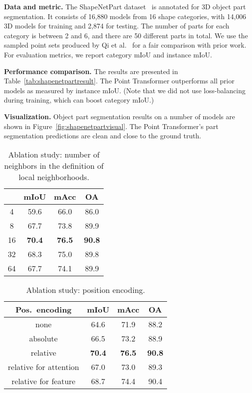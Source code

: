 \documentclass[final]{cvpr}
\newcommand\mypara[1]{\vspace{1mm}\noindent\textbf{#1}}
\begin{document}
\noindent\textbf{Data and metric.}
The ShapeNetPart dataset~\cite{yi2016scalable} is annotated for 3D object part segmentation. It consists of 16,880 models from 16 shape categories, with 14,006 3D models for training and 2,874 for testing. The number of parts for each category is between 2 and 6, and there are 50 different parts in total. We use the sampled point sets produced by Qi et al.~\cite{qi2017pointnet2} for a fair comparison with prior work. For evaluation metrics, we report category mIoU and instance mIoU.

\mypara{Performance comparison.}
The results are presented in Table~\ref{tab:shapenetpartresult}. The Point Transformer outperforms all prior models as measured by instance mIoU.
(Note that we did not use loss-balancing during training, which can boost category mIoU.)

\mypara{Visualization.}
Object part segmentation results on a number of models are shown in Figure~\ref{fig:shapenetpartvisual}. The Point Transformer's part segmentation predictions are clean and close to the ground truth.

\begin{table}
	\centering
	\begin{tabular}{ c | c c c }
		\toprule[1pt]
		 & mIoU & mAcc & OA \\
		\hline
		4 & 59.6 & 66.0 & 86.0 \\
		8 & 67.7 & 73.8 & 89.9 \\
		16 & \textbf{70.4} & \textbf{76.5} & \textbf{90.8} \\
		32 & 68.3 & 75.0 & 89.8 \\
		64 & 67.7 & 74.1 & 89.9 \\
		\bottomrule[1pt]
	\end{tabular}
	\caption{Ablation study: number of neighbors  in the definition of local neighborhoods.}
	\label{tab:s3disknn}
\end{table}

\begin{table}
	\centering
	\begin{tabular}{ c | c c c }
		\toprule[1pt]
		Pos.\ encoding & mIoU & mAcc & OA \\
		\hline
		none & 64.6 & 71.9 & 88.2 \\
		absolute & 66.5 & 73.2 & 88.9 \\
		relative & \textbf{70.4} & \textbf{76.5} & \textbf{90.8} \\
		relative for attention & 67.0 & 73.0 & 89.3 \\
		relative for feature & 68.7 & 74.4 & 90.4 \\
		\bottomrule[1pt]
	\end{tabular}
	\caption{Ablation study: position encoding.}
	\label{tab:s3disposition}
\end{table}
\end{document}
